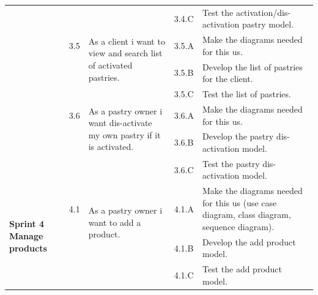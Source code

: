 \documentclass[12pt,a4paper]{report}
\begin{document}
	\begin{table}[H]
		\begin{center}
			\setlength\doublerulesep{0.5pt}
			\begin{tabular}{|  p{3cm}|  p{1cm}| p{4cm}|  p{1cm}| p{6cm}|}
				
				\cline{4-5}    
				&                   
				&                                 
				&                        
				3.4.C &                        
				Test the activation/dis-activation pastry model.
				\\
				\cline{2-5}  
				
				&                       
				3.5  &  
				\multirow{2}{4cm}{As a client i want to view and search list of activated pastries.}
				
				&				                      
				3.5.A &                        
				Make the diagrams needed for this \ac{us}.
				\\ 
				\cline{4-5}    
				&                   
				&                                 
				&                        
				3.5.B &                        
				Develop the list of pastries for the client.
				\\ 
				\cline{4-5}    
				&                   
				&                                 
				&                        
				3.5.C & 
				Test the list of pastries.                       
				\\
				\cline{2-5}  
				
				&                       
				3.6  &  
				\multirow{2}{4cm}{As a pastry owner i want dis-activate my own pastry if it is activated.}
				
				&				                      
				3.6.A &                        
				Make the diagrams needed for this \ac{us}.
				\\ 
				\cline{4-5}    
				&                   
				&                                 
				&                        
				3.6.B &                        
				Develop the pastry dis-activation model.
				\\ 
				\cline{4-5}    
				&                   
				&                                 
				&                        
				3.6.C &                        
				Test the pastry dis-activation model.
			
				\\
				 \hline
				\multirow{5}{3cm}{\textbf{Sprint 4} \textbf{Manage products} }
				&                       
				4.1  &  
				\multirow{2}{4cm}{As a pastry owner i want to add a product.}
				
				&				                      
				4.1.A &                        
				Make the diagrams needed for this \ac{us} (use case diagram, class diagram, sequence diagram).
				\\ 
				\cline{4-5}    
				&                   
				&                                 
				&                        
				4.1.B &                        
				Develop the add product model.
				\\ 
				\cline{4-5}    
				&                   
				&                                 
				&                        
				4.1.C &                        
				Test the add product model.
				\\
				\cline{2-5}  
				

\end{tabular}
\end{center}
\end{table}
\end{document}
